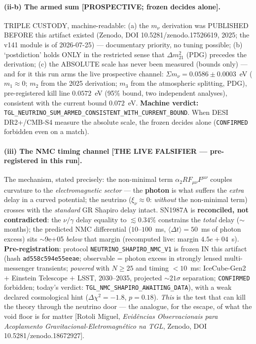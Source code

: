 \documentclass[11pt]{article}
\theoremstyle{definition}\newtheorem{deriv}{Derivation}
\begin{document}
\paragraph{(ii-b) The armed sum \textsf{[PROSPECTIVE; frozen decides alone].}} TRIPLE CUSTODY, machine-readable: (a) the $m_\nu$ derivation was PUBLISHED BEFORE this artifact existed (Zenodo, DOI 10.5281/zenodo.17526619, 2025; the v141 module is of 2026-07-25) --- documentary priority, no tuning possible; (b) `postdiction' holds ONLY in the restricted sense that $\Delta m^2_{21}$ (PDG) precedes the derivation; (c) the ABSOLUTE scale has never been measured (bounds only) --- and for it this run arms the live prospective channel: $\Sigma m_\nu = 0.0586 \pm 0.0003$~eV ($m_1\!\approx\!0$; $m_2$ from the 2025 derivation; $m_3$ from the atmospheric splitting, PDG), pre-registered kill line $0.0572$~eV (95\% bound, two independent analyses), consistent with the current bound $0.072$~eV. \textbf{Machine verdict:} \texttt{TGL\_NEUTRINO\_SUM\_ARMED\_CONSISTENT\_WITH\_CURRENT\_BOUND}. When DESI DR2+/CMB-S4 measure the absolute scale, the frozen decides alone (\texttt{CONFIRMED} forbidden even on a match).

\paragraph{(iii) The NMC timing channel \textsf{[THE LIVE FALSIFIER --- pre-registered in this run].}} The mechanism, stated precisely: the non-minimal term $\alpha_2 R F_{\mu\nu}F^{\mu\nu}$ \cite{rotolinmc2026} couples curvature to the \emph{electromagnetic sector} --- the \textbf{photon} is what suffers the \emph{extra} delay in a curved potential; the neutrino ($\xi_\nu\approx0$: \emph{without} the non-minimal term) crosses with the \emph{standard} GR Shapiro delay intact. SN1987A is \textbf{reconciled, not contradicted}: the $\nu/\gamma$ delay equality to $\lesssim0.34\%$ \cite{longo1988,krauss1988} constrains the \emph{total} delay ($\sim$months); the predicted NMC differential ($10$--$100$~ms, $\langle\Delta t\rangle=50$~ms of photon excess) sits $\sim$9e+05 \emph{below} that margin (recomputed live: margin $4.5e+04$~s). \textbf{Pre-registration}: protocol \texttt{NEUTRINO\_SHAPIRO\_NMC\_V1} is frozen IN this artifact (hash \texttt{ad558c594e55eeae}; observable = photon excess in strongly lensed multi-messenger transients; \emph{powered} with $N\geq25$ and timing $<10$~ms: IceCube-Gen2 $+$ Einstein Telescope $+$ LSST, 2030--2035, projected $\sim21\sigma$ separation; \texttt{CONFIRMED} forbidden; today's verdict: \texttt{TGL\_NMC\_SHAPIRO\_AWAITING\_DATA}), with a weak declared cosmological hint ($\Delta\chi^2=-1.8$, $p=0.18$). \emph{This} is the test that can kill the theory through the neutrino door --- the analogue, for the escape, of what the void floor is for matter [Rotoli Miguel, \emph{Evidências Observacionais para Acoplamento Gravitacional-Eletromagnético na TGL}, Zenodo, DOI 10.5281/zenodo.18672927].
\end{document}
